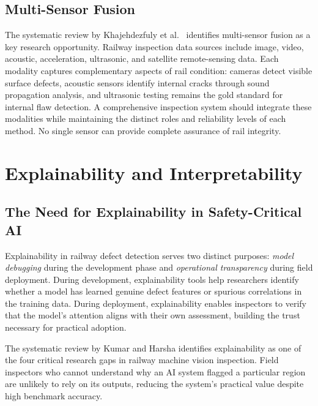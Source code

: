 \documentclass[conference]{IEEE}
\begin{document}
\subsection{Multi-Sensor Fusion}

The systematic review by Khajehdezfuly et al.\ \cite{khajeh2025} identifies multi-sensor fusion as a key research opportunity. Railway inspection data sources include image, video, acoustic, acceleration, ultrasonic, and satellite remote-sensing data. Each modality captures complementary aspects of rail condition: cameras detect visible surface defects, acoustic sensors identify internal cracks through sound propagation analysis, and ultrasonic testing remains the gold standard for internal flaw detection. A comprehensive inspection system should integrate these modalities while maintaining the distinct roles and reliability levels of each method. No single sensor can provide complete assurance of rail integrity.

\section{Explainability and Interpretability}
\label{sec:explainability}

\subsection{The Need for Explainability in Safety-Critical AI}

Explainability in railway defect detection serves two distinct purposes: \textit{model debugging} during the development phase and \textit{operational transparency} during field deployment. During development, explainability tools help researchers identify whether a model has learned genuine defect features or spurious correlations in the training data. During deployment, explainability enables inspectors to verify that the model's attention aligns with their own assessment, building the trust necessary for practical adoption.

The systematic review by Kumar and Harsha \cite{kumar2025} identifies explainability as one of the four critical research gaps in railway machine vision inspection. Field inspectors who cannot understand why an AI system flagged a particular region are unlikely to rely on its outputs, reducing the system's practical value despite high benchmark accuracy.
\end{document}
